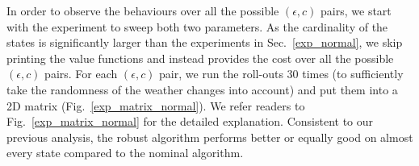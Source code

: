 \documentclass[11pt,reqno]{amsart}
\theoremstyle{definition}
\numberwithin{equation}{section}
\theoremstyle{remark}
\begin{document}
\medskip

In order to observe the behaviours over all the possible $(\epsilon, c)$ pairs, we start with the experiment to sweep both two parameters. As the cardinality of the states is significantly larger than the experiments in Sec.~\ref{exp_normal}, we skip printing the value functions and instead provides the cost over all the possible $(\epsilon, c)$ pairs. For each $(\epsilon, c)$ pair, we run the roll-outs 30 times (to sufficiently take the randomness of the weather changes into account) and put them into a 2D matrix (Fig.~\ref{exp_matrix_normal}). We refer readers to Fig.~\ref{exp_matrix_normal} for the detailed explanation. Consistent to our previous analysis, the robust algorithm performs better or equally good on almost every state compared to the nominal algorithm.
\end{document}
